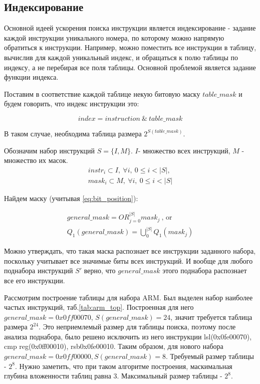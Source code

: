 \subsection{Индексирование}
Основной идеей ускорения поиска инструкции является индексирование - задание каждой инструкции уникального номера, по которому можно напрямую обратиться к инструкции. Например, можно поместить все инструкции в таблицу, вычислив для каждой уникальный индекс, и обращаться к полю таблицы по индексу, а не перебирая все поля таблицы. Основной проблемой является задание функции индекса. 

Поставим в соответствие каждой таблице некую битовую маску $table\_mask$ и будем говорить, что индекс инструкции это:

\begin{equation}\label{eq:index}
	index = instruction\ \&\ table\_mask
\end{equation}

В таком случае, необходима таблица размера $2^{S(table\_mask)}$.

Обозначим набор инструкций $S=\{I, M\}$. $I$- множество всех инструкций, $M$ - множество их масок.
\begin{eqnarray*}
	instr_i \subset I,\ \forall i,\ 0 \le i < |S|, \\
	mask_i \subset M,\ \forall i,\ 0 \le i < |S|
\end{eqnarray*}

Найдем маску (учитывая \ref{eq:bit_position}):

\begin{eqnarray} \label{eq:general_mask}
	general\_mask = OR_{j=0}^{|S|}mask_j\ \text{, or}\nonumber \\
	Q_1(general\_mask)=\bigcup_{0}^{|S|}Q_1(mask_j)
\end{eqnarray}

Можно утверждать, что такая маска распознает все инструкции заданного набора, поскольку учитывает все значимые биты всех инструкций. И вообще для любого поднабора инструкций $S'$ верно, что $general\_mask$ этого поднабора распознает все его инструкции.

Рассмотрим построение таблицы для набора ARM. Был выделен набор наиболее частых инструкций, таб.\ref{tab:arm_top}. Построенная для него $general\_mask=0x0ff00070$, $S(general\_mask)=24$, значит требуется таблица размера $2^{24}$. Это неприемлемый размер для таблицы поиска, поэтому после анализа поднабора, было решено исключить из него инструкции lsl(0x0fe00070), cmp reg(0x0ff00010), rsb{0x0fe00010}. Таким образом, для нового набора $general\_mask=0x0ff00000, S(general\_mask)=8$. Требуемый размер таблицы - $2^8$. Нужно заметить, что при таком алгоритме построения, маскимальная глубина вложенности таблиц равна 3. Максимальный размер таблицы - $2^8$. 

